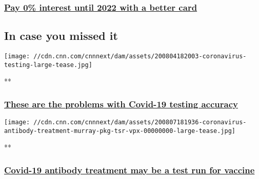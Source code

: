\begin{itemize}
{  \subsubsection{\texorpdfstring{\href{https://www.comparecards.com/guide/pay-0-interest-2022?esourceid=6422486\&utm_source=cnn\&utm_medium=native\&pla=cnn.com\&bdst=rv\&acqs=prospecting\&utm_campaign=sectionfront\&grp=pay-0-2022\&tar=sectionfront\&utm_content=pay+o+interest+until+2022+with+a+better+card\&adt=blueeyescardplaid\&mtaid=8631C\&ad_group_name=pay-0-2022\&ad_position=3\&campaign_name=sectionfront_pay-0-2022\&placement_name=sectionfront\&ad_headline=pay+o+interest+until+2022+with+a+better+card\&ad_image_name=blueeyescardplaid}{Pay
  0\% interest until 2022 with a better
  card}}{Pay 0\% interest until 2022 with a better card}}\label{pay-0-interest-until-2022-with-a-better-card}}
\end{itemize}

\hypertarget{in-case-you-missed-it-}{%
\subsection{In case you missed it~}\label{in-case-you-missed-it-}}

\href{/videos/health/2020/08/08/coronavirus-testing-inaccuracies-kaye-pkg-ac360-vpx.cnn}{}

\texttt{[image: //cdn.cnn.com/cnnnext/dam/assets/200804182003-coronavirus-testing-large-tease.jpg]}

**

\hypertarget{these-are-the-problems-with-covid-19-testing-accuracy}{%
\subsubsection{\texorpdfstring{\href{/videos/health/2020/08/08/coronavirus-testing-inaccuracies-kaye-pkg-ac360-vpx.cnn}{These
are the problems with Covid-19 testing
accuracy}}{These are the problems with Covid-19 testing accuracy}}\label{these-are-the-problems-with-covid-19-testing-accuracy}}

\href{/videos/health/2020/08/07/coronavirus-antibody-treatment-murray-pkg-tsr-vpx.cnn}{}

\texttt{[image: //cdn.cnn.com/cnnnext/dam/assets/200807181936-coronavirus-antibody-treatment-murray-pkg-tsr-vpx-00000000-large-tease.jpg]}

**

\hypertarget{covid-19-antibody-treatment-may-be-a-test-run-for-vaccine}{%
\subsubsection{\texorpdfstring{\href{/videos/health/2020/08/07/coronavirus-antibody-treatment-murray-pkg-tsr-vpx.cnn}{Covid-19
antibody treatment may be a test run for
vaccine}}{Covid-19 antibody treatment may be a test run for vaccine}}\label{covid-19-antibody-treatment-may-be-a-test-run-for-vaccine}}

